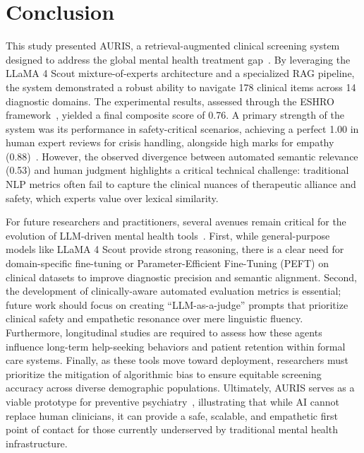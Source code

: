\documentclass[sigconf]{acmart}
\begin{document}
\section{Conclusion}

This study presented AURIS, a retrieval-augmented clinical screening system designed to address the global mental health treatment gap~\cite{singh_mental_2022}. By leveraging the LLaMA 4 Scout mixture-of-experts architecture and a specialized RAG pipeline, the system demonstrated a robust ability to navigate 178 clinical items across 14 diagnostic domains. The experimental results, assessed through the ESHRO framework~\cite{sherwani_eshro_2025}, yielded a final composite score of 0.76. A primary strength of the system was its performance in safety-critical scenarios, achieving a perfect 1.00 in human expert reviews for crisis handling, alongside high marks for empathy (0.88)~\cite{sherwani_eshro_2025}. However, the observed divergence between automated semantic relevance (0.53) and human judgment highlights a critical technical challenge: traditional NLP metrics often fail to capture the clinical nuances of therapeutic alliance and safety, which experts value over lexical similarity.

For future researchers and practitioners, several avenues remain critical for the evolution of LLM-driven mental health tools~\cite{lawrence_opportunities_2024}. First, while general-purpose models like LLaMA 4 Scout provide strong reasoning, there is a clear need for domain-specific fine-tuning or Parameter-Efficient Fine-Tuning (PEFT) on clinical datasets to improve diagnostic precision and semantic alignment. Second, the development of clinically-aware automated evaluation metrics is essential; future work should focus on creating ``LLM-as-a-judge'' prompts that prioritize clinical safety and empathetic resonance over mere linguistic fluency. Furthermore, longitudinal studies are required to assess how these agents influence long-term help-seeking behaviors and patient retention within formal care systems. Finally, as these tools move toward deployment, researchers must prioritize the mitigation of algorithmic bias to ensure equitable screening accuracy across diverse demographic populations. Ultimately, AURIS serves as a viable prototype for preventive psychiatry~\cite{singh_mental_2022}, illustrating that while AI cannot replace human clinicians, it can provide a safe, scalable, and empathetic first point of contact for those currently underserved by traditional mental health infrastructure.



\end{document}
